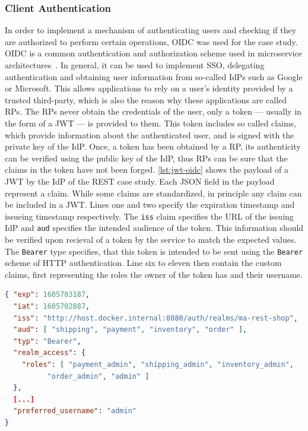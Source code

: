 \subsubsection{Client Authentication}

In order to implement a mechanism of authenticating users and checking if they are authorized to perform certain operations, \ac{OIDC} was used for the case study.
\ac{OIDC} is a common authentication and authorization scheme used in microservice architectures~\cite{Nehme2019, Hammann2020}.
In general, it can be used to implement \ac{SSO}, delegating authentication and obtaining user information from so-called \acp{IdP} such as Google or Microsoft.
This allows applications to rely on a user's identity provided by a trusted third-party, which is also the reason why these applications are called \acp{RP}.
The \acp{RP} never obtain the credentials of the user, only a token --- usually in the form of a \ac{JWT} --- is provided to them.
This token includes so called claims, which provide information about the authenticated user, and is signed with the private key of the \ac{IdP}.
Once, a token has been obtained by a \ac{RP}, its authenticity can be verified using the public key of the \ac{IdP}, thus \acp{RP} can be sure that the claims in the token have not been forged.
\autoref{lst:jwt-oidc} shows the payload of a \ac{JWT} by the \ac{IdP} of the \ac{REST} case study.
Each \ac{JSON} field in the payload represent a claim.
While some claims are standardized, in principle any claim can be included in a \ac{JWT}.
Lines one and two specify the expiration timestamp and issueing timestamp respectively.
The \texttt{iss} claim specifies the \ac{URL} of the issuing \ac{IdP} and \texttt{aud} specifies the intended audience of the token.
This information should be verified upon recieval of a token by the service to match the expected values.
The \texttt{Bearer} type specifies, that this token is intended to be sent using the \texttt{Bearer} scheme of \ac{HTTP} authentication.
Line six to eleven then contain the custom claims, first representing the roles the owner of the token has and their username.

\begin{lstlisting}[caption={\ac{JWT} Issued by an \ac{IdP}}, language=json, label={lst:jwt-oidc}]
{ "exp": 1605703187,
  "iat": 1605702887,
  "iss": "http://host.docker.internal:8080/auth/realms/ma-rest-shop",
  "aud": [ "shipping", "payment", "inventory", "order" ],
  "typ": "Bearer",
  "realm_access": {
    "roles": [ "payment_admin", "shipping_admin", "inventory_admin",
          "order_admin", "admin" ]
  },
  [...]
  "preferred_username": "admin"
}
\end{lstlisting}

